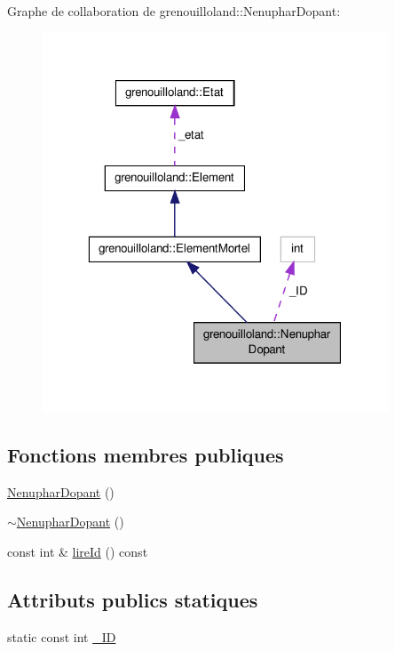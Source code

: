 Graphe de collaboration de grenouilloland\-:\-:Nenuphar\-Dopant\-:
\nopagebreak
\begin{figure}[H]
\begin{center}
\leavevmode
\includegraphics[width=292pt]{classgrenouilloland_1_1NenupharDopant__coll__graph}
\end{center}
\end{figure}
\subsection*{Fonctions membres publiques}
\begin{DoxyCompactItemize}
\item 
\hyperlink{classgrenouilloland_1_1NenupharDopant_af1e5ea1c932d04fe72e6e944a32e52b4}{Nenuphar\-Dopant} ()
\item 
\hyperlink{classgrenouilloland_1_1NenupharDopant_a06781dafde6673932977f636e4c177cd}{$\sim$\-Nenuphar\-Dopant} ()
\item 
const int \& \hyperlink{classgrenouilloland_1_1NenupharDopant_a45374c5e71552f943b8a9729892d5f02}{lire\-Id} () const 
\end{DoxyCompactItemize}
\subsection*{Attributs publics statiques}
\begin{DoxyCompactItemize}
\item 
static const int \hyperlink{classgrenouilloland_1_1NenupharDopant_a4c6cfe51f482da3b7483dde8795787ca}{\-\_\-\-I\-D}
\end{DoxyCompactItemize}
